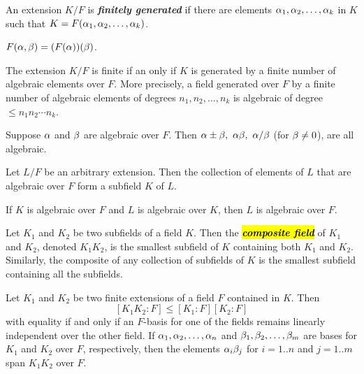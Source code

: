 \nl

\begin{defn}
An extension $K/F$ is \textbf{\textit{finitely generated}} if there are elements $\alpha_1,\alpha_2,\ldots,\alpha_k$ in $K$ such that $K = F(\alpha_1,\alpha_2,\ldots,\alpha_k)$.
\end{defn}

\nl

\begin{lem}
$F(\alpha,\beta)= (F(\alpha))(\beta)$.
\end{lem}

\nl

\begin{thm}
The extension $K/F$ is finite if an only if $K$ is generated by a finite number of algebraic elements over $F$. More precisely, a field generated over $F$ by a finite number of algebraic elements of degrees $n_1,n_2,\ldots, n_k$ is algebraic of degree $\leq n_1n_2\cdots n_k$.
\end{thm}

\nl

\begin{cor}
Suppose $\alpha$ and $\beta$ are algebraic over $F$. Then $\alpha\pm\beta,\ \alpha\beta,\ \alpha/\beta$ (for $\beta\neq 0$), are all algebraic.
\end{cor}

\nl

\begin{cor}
Let $L/F$ be an arbitrary extension. Then the collection of elements of $L$ that are algebraic over $F$ form a subfield $K$ of $L$.
\end{cor}

\nl

\begin{thm}
If $K$ is algebraic over $F$ and $L$ is algebraic over $K$, then $L$ is algebraic over $F$.
\end{thm}

\nl

\begin{defn}
Let $K_1$ and $K_2$ be two subfields of a field $K$. Then the \hl{\textit{\textbf{composite field}}} of $K_1$ and $K_2$, denoted $K_1K_2$, is the smallest subfield of $K$ containing both $K_1$ and $K_2$. Similarly, the composite of any collection of subfields of $K$ is the smallest subfield containing all the subfields.
\end{defn}

\nl

\begin{prop}
Let $K_1$ and $K_2$ be two finite extensions of a field $F$ contained in $K$. Then
\[[K_1K_2:F]\leq[K_1:F][K_2:F]\]
with equality if and only if an $F$-basis for one of the fields remains linearly independent over the other field. If $\alpha_1,\alpha_2,\ldots,\alpha_n$ and $\beta_1,\beta_2,\ldots,\beta_m$ are bases for $K_1$ and $K_2$ over $F$, respectively, then the elements $\alpha_i\beta_j$ for $i = 1..n$ and $j = 1..m$ span $K_1K_2$ over $F$.
\end{prop}


